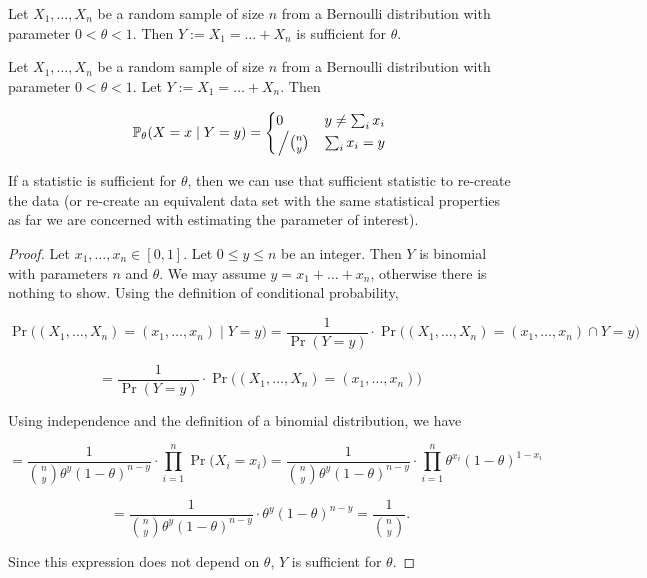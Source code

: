 \begin{example}\label{mathstats.541a.ex.5.2} Let \(X_1, \ldots, X_n\) be a random sample of size \(n\) from a Bernoulli distribution with parameter \(0 < \theta < 1\). Then \(Y:= X_1 = \ldots + X_n\) is sufficient for \(\theta\).

\end{example}

\begin{proposition}\label{mathstats.541a.ex.5.2} Let \(X_1, \ldots, X_n\) be a random sample of size \(n\) from a Bernoulli distribution with parameter \(0 < \theta < 1\). Let \(Y:= X_1 = \ldots + X_n\). Then

\[
\mathbb{P}_\theta(X=x \mid Y=y) = \begin{cases}
0 & y \neq \sum_i x_i \\
\left. \middle/ \binom{n}{y} \right. & \sum_i x_i = y
\end{cases}
\]

\end{proposition}

\begin{remark} If a statistic is sufficient for \(\theta\), then we can use that sufficient statistic to re-create the data (or re-create an equivalent data set with the same statistical properties as far we are concerned with estimating the parameter of interest).

\end{remark}

\begin{proof} Let \(x_1, \ldots, x_n \in [0,1]\). Let \(0 \leq y \leq n\) be an integer. Then \(Y\) is binomial with parameters \(n\) and \(\theta\). We may assume \(y = x_1 + \ldots + x_n\), otherwise there is nothing to show. Using the definition of conditional probability, 

\[
\Pr\big( (X_1, \ldots, X_n) = (x_1, \ldots, x_n) \mid Y = y \big) = \frac{1}{\Pr(Y=y)} \cdot \Pr\big( (X_1, \ldots, X_n) = (x_1, \ldots, x_n) \cap Y = y \big) 
\]

\[
= \frac{1}{\Pr(Y=y)} \cdot \Pr\big( (X_1, \ldots, X_n) = (x_1, \ldots, x_n) \big) 
\]

Using independence and the definition of a binomial distribution, we have

\[
= \frac{1}{\binom{n}{y} \theta^y (1 - \theta)^{n-y}} \cdot \prod_{i=1}^n \Pr\big( X_i = x_i \big)  = \frac{1}{\binom{n}{y} \theta^y (1 - \theta)^{n-y}} \cdot \prod_{i=1}^n \theta^{x_i} (1- \theta)^{1-x_i}
\]

\[
= \frac{1}{\binom{n}{y} \theta^y (1 - \theta)^{n-y}} \cdot \theta^{y} (1- \theta)^{n-y} = \frac{1}{\binom{n}{y}}.
\]

Since this expression does not depend on \(\theta\), \(Y\) is sufficient for \(\theta\).

\end{proof}

